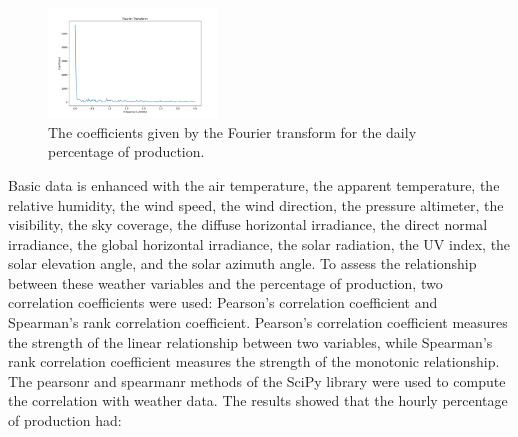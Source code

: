 \begin{figure}[H]
\centering
\includegraphics[width=0.4\textwidth]{images/production/ft_day}
\caption{The coefficients given by the Fourier transform for the daily percentage of production.}
\label{fig:productionftday}
\end{figure}

Basic data is enhanced with the air temperature, the apparent temperature, the relative humidity, the wind speed, the wind direction, the pressure altimeter, the visibility, the sky coverage, the diffuse horizontal irradiance, the direct normal irradiance, the global horizontal irradiance, the solar radiation, the UV index, the solar elevation angle, and the solar azimuth angle.
To assess the relationship between these weather variables and the percentage of production, two correlation coefficients were used: Pearson's correlation coefficient and Spearman's rank correlation coefficient.
Pearson's correlation coefficient measures the strength of the linear relationship between two variables, while Spearman's rank correlation coefficient measures the strength of the monotonic relationship.
The pearsonr and spearmanr methods of the SciPy library were used to compute the correlation with weather data.
The results showed that the hourly percentage of production had:
